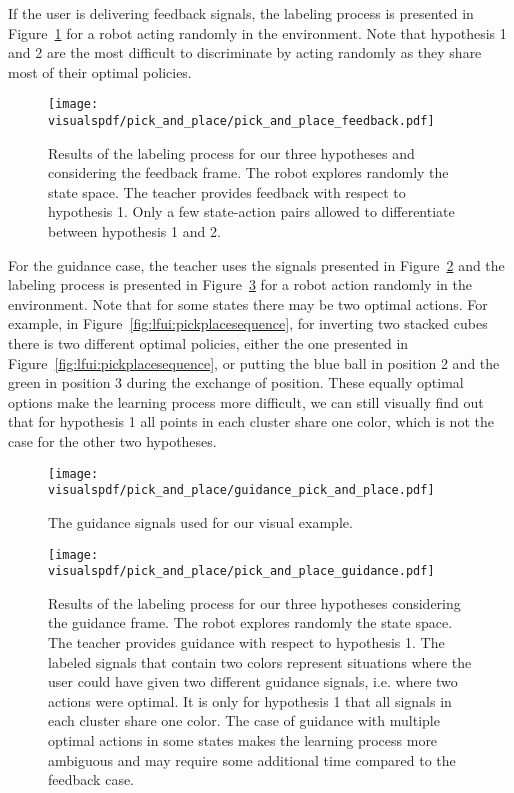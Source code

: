 If the user is delivering feedback signals, the labeling process is presented in Figure~\ref{fig:lfui:pickplacefeedback} for a robot acting randomly in the environment. Note that hypothesis 1 and 2 are the most difficult to discriminate by acting randomly as they share most of their optimal policies.

\begin{figure}[!htbp]
  \centering
  \texttt{[image: \\visualspdf/pick\_and\_place/pick\_and\_place\_feedback.pdf]}
  \caption{Results of the labeling process for our three hypotheses and considering the feedback frame. The robot explores randomly the state space. The teacher provides feedback with respect to hypothesis 1. Only a few state-action pairs allowed to differentiate between hypothesis 1 and 2.}
  \label{fig:lfui:pickplacefeedback}
\end{figure}

For the guidance case, the teacher uses the signals presented in Figure~\ref{fig:lfui:pickplaceguidancesignals} and the labeling process is presented in Figure~\ref{fig:lfui:pickplaceguidance} for a robot action randomly in the environment. Note that for some states there may be two optimal actions. For example, in Figure~\ref{fig:lfui:pickplacesequence}, for inverting two stacked cubes there is two different optimal policies, either the one presented in Figure~\ref{fig:lfui:pickplacesequence}, or putting the blue ball in position 2 and the green in position 3 during the exchange of position. These equally optimal options make the learning process more difficult, we can still visually find out that for hypothesis 1 all points in each cluster share one color, which is not the case for the other two hypotheses.

\begin{figure}[!htbp]
  \centering
  \texttt{[image: \\visualspdf/pick\_and\_place/guidance\_pick\_and\_place.pdf]}
  \caption{The guidance signals used for our visual example.}
  \label{fig:lfui:pickplaceguidancesignals}
\end{figure}

\begin{figure}[!htbp]
  \centering
  \texttt{[image: \\visualspdf/pick\_and\_place/pick\_and\_place\_guidance.pdf]}
  \caption{Results of the labeling process for our three hypotheses considering the guidance frame. The robot explores randomly the state space. The teacher provides guidance with respect to hypothesis 1. The labeled signals that contain two colors represent situations where the user could have given two different guidance signals, i.e. where two actions were optimal. It is only for hypothesis 1 that all signals in each cluster share one color. The case of guidance with multiple optimal actions in some states makes the learning process more ambiguous and may require some additional time compared to the feedback case.}
  \label{fig:lfui:pickplaceguidance}
\end{figure}

